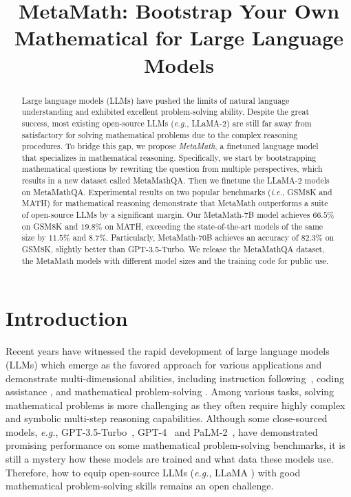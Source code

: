 \title{MetaMath: Bootstrap Your Own Mathematical for Large Language Models}

\begin{abstract}
Large language models (LLMs) have pushed the limits of natural language understanding and exhibited excellent problem-solving ability. Despite the great success, most existing open-source LLMs (\emph{e.g.}, LLaMA-2) are still far away from satisfactory for solving mathematical problems due to the complex reasoning procedures. To bridge this gap, we propose \emph{MetaMath}, a finetuned language model that specializes in mathematical reasoning. Specifically, we start by bootstrapping mathematical questions by rewriting the question from multiple perspectives, which results in a new dataset called {MetaMathQA}. Then we finetune the LLaMA-2 models on MetaMathQA. Experimental results on two popular benchmarks (\emph{i.e.}, GSM8K and MATH) for mathematical reasoning demonstrate that MetaMath outperforms a suite of open-source LLMs by a significant margin.  Our MetaMath-7B model achieves $66.5\%$ on GSM8K and $19.8\%$ on MATH, exceeding the state-of-the-art models of the same size by $11.5\%$ and $8.7\%$.
    Particularly,
    {MetaMath-70B} achieves an accuracy of $82.3\%$ on {GSM8K}, slightly better than {GPT-3.5-Turbo}. We release the {MetaMathQA} dataset, the {MetaMath} models with different model sizes and the training code for public use.
\end{abstract}

\section{Introduction}

    Recent years have witnessed the rapid development of large language models (LLMs) which emerge as the favored approach for various applications and demonstrate multi-dimensional abilities, including instruction following~\citep{brown2020language,alpaca,ouyang2022training, li2023deepinception}, coding assistance \citep{chen2021evaluating,nijkamp2022codegen,luo2023wizardcoder,li2023starcoder}, and mathematical problem-solving \citep{yuan2023scaling,imani2023mathprompter,luo2023wizardmath, collins2023evaluating}. Among various tasks, solving mathematical problems is more challenging as they often require highly complex and symbolic multi-step reasoning capabilities. Although some close-sourced models, \emph{e.g.}, {GPT-3.5-Turbo}~\citep{gpt3-5}, {GPT-4}~\citep{gpt4} and {PaLM-2}~\citep{touvron2023llama}, have demonstrated promising performance on some mathematical problem-solving benchmarks, it is still a mystery how these models are trained and what data these models use. Therefore, how to equip open-source LLMs (\emph{e.g.}, {LLaMA} \citep{touvron2023llama1,touvron2023llama}) with good mathematical problem-solving skills remains an open challenge. 

